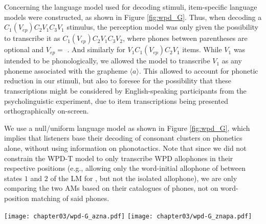 {%
Concerning the language model used for decoding stimuli, item-specific language models were constructed, as shown in Figure {\color{red}\ref{fig:wpd_G}}. Thus, when decoding a $C_{1}(V_{ep})C_{2}V_{1}C_{3}V_{1}$ stimulus, the perception model was only given the possibility to transcribe it as $C_{1}(V_{ep})C_{2}V_{1}C_{3}V_{2}$, where phones between parentheses are optional and $V_{ep} = $ \textipa{[@]}. And similarly for $V_{1}C_{1}(V_{ep})C_{2}V_{1}$ items.
While $V_{1}$ was intended to be  phonologically, we allowed the model to transcribe $V_{1}$ as any phoneme associated with the grapheme $\langle a \rangle$. This allowed to account for phonetic reduction in our stimuli, but also to foresee for the possibility that these transcriptions might be considered by English-speaking participants from the psycholinguistic experiment, due to item transcriptions being presented orthographically on-screen.

We use a null/uniform language model as shown in Figure \ref{fig:wpd_G}, which implies that listeners base their decoding of consonant clusters on phonetics alone, without using information on phonotactics. Note that since we did not constrain the WPD-T model to only transcribe WPD allophones in their respective positions (e.g., allowing only the word-initial allophone of  between states $1$ and $2$ of the LM for , but not the isolated  allophone), we are only comparing the two AMs based on their catalogues of phones, not on word-position matching of said phones.   

\begin{figure*}[htb]
\centering
\texttt{[image: chapter03/wpd-G\_azna.pdf]}
\vspace{0.5cm}
\texttt{[image: chapter03/wpd-G\_znapa.pdf]}
\caption{Constrained language model used to test the models (here: LMs for  (top) and  (bottom) trials). Nodes in the graph represent states, edges represent transitions between states (here: phonemes, transcribed in WSJ notation). Models were given the choice to transcribe the phoneme  with any of the phonemes linked to the grapheme $\langle a \rangle$, as English listeners might have also done so during the task. The LMs are ``null'', as they only constrain the possible decoding outputs without assigning higher or lower probabilities to certain edges. The optimal decoding path is therefore only dependent on the acoustic scores.}
\label{fig:wpd_G}
\end{figure*}

}
